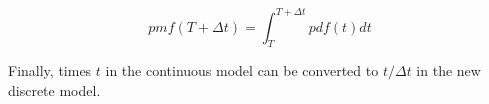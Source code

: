 \begin{equation}
pmf(T+\Delta t) =  \int_{T}^{T+\Delta t} pdf(t) dt
\end{equation}

Finally, times $t$ in the continuous model can be converted to $t/\Delta t$ in 
the new discrete model.

